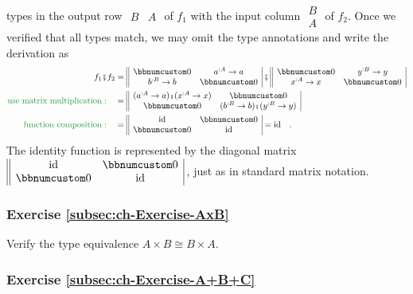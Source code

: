 types in the output row $\begin{array}{||cc|}
B & A\end{array}$ of $f_{1}$ with the input column $\begin{array}{|c||}
B\\
A
\end{array}$ of $f_{2}$. Once we verified that all types match, we may omit the
type annotations and write the derivation as
\begin{align*}
f_{1}\bef f_{2} & =\begin{array}{||cc|}
\bbnum 0 & a^{:A}\rightarrow a\\
b^{:B}\rightarrow b & \bbnum 0
\end{array}\,\bef\,\begin{array}{||cc|}
\bbnum 0 & y^{:B}\rightarrow y\\
x^{:A}\rightarrow x & \bbnum 0
\end{array}\\
{\color{greenunder}\text{use matrix multiplication}:}\quad & =\begin{array}{||cc|}
(a^{:A}\rightarrow a)\bef(x^{:A}\rightarrow x) & \bbnum 0\\
\bbnum 0 & (b^{:B}\rightarrow b)\bef(y^{:B}\rightarrow y)
\end{array}\\
{\color{greenunder}\text{function composition}:}\quad & =\begin{array}{||cc|}
\text{id} & \bbnum 0\\
\bbnum 0 & \text{id}
\end{array}=\text{id}\quad.
\end{align*}
The identity function is represented by the diagonal matrix $\begin{array}{||cc|}
\text{id} & \bbnum 0\\
\bbnum 0 & \text{id}
\end{array}\,$, just as in standard matrix notation.

\subsubsection{Exercise \label{subsec:ch-Exercise-AxB}\ref{subsec:ch-Exercise-AxB}}

Verify the type equivalence $A\times B\cong B\times A$.

\subsubsection{Exercise \label{subsec:ch-Exercise-A+B+C}\ref{subsec:ch-Exercise-A+B+C}}

